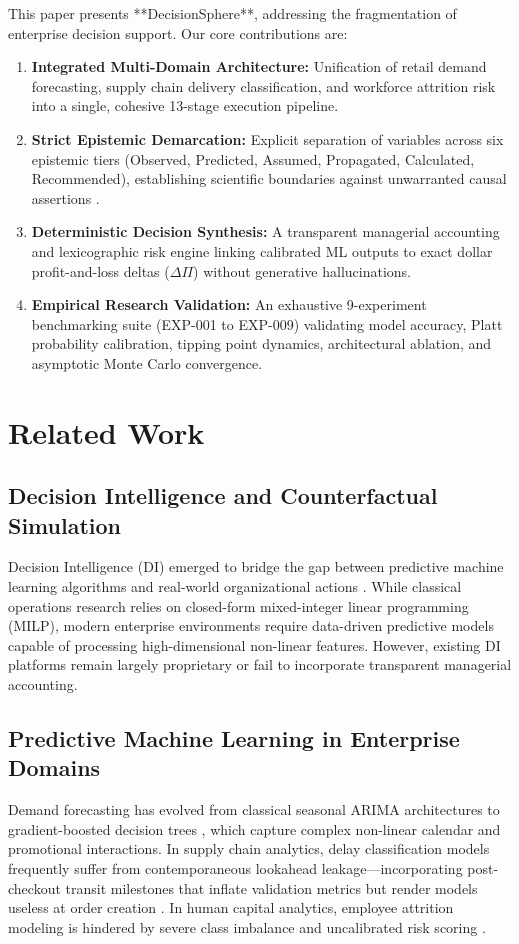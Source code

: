 \documentclass[conference]{IEEEtran}
\begin{document}
This paper presents **DecisionSphere**, addressing the fragmentation of enterprise decision support. Our core contributions are:
\begin{enumerate}
    \item \textbf{Integrated Multi-Domain Architecture:} Unification of retail demand forecasting, supply chain delivery classification, and workforce attrition risk into a single, cohesive 13-stage execution pipeline.
    \item \textbf{Strict Epistemic Demarcation:} Explicit separation of variables across six epistemic tiers (Observed, Predicted, Assumed, Propagated, Calculated, Recommended), establishing scientific boundaries against unwarranted causal assertions \cite{shmueli2010explain}.
    \item \textbf{Deterministic Decision Synthesis:} A transparent managerial accounting and lexicographic risk engine linking calibrated ML outputs to exact dollar profit-and-loss deltas ($\Delta \Pi$) without generative hallucinations.
    \item \textbf{Empirical Research Validation:} An exhaustive 9-experiment benchmarking suite (EXP-001 to EXP-009) validating model accuracy, Platt probability calibration, tipping point dynamics, architectural ablation, and asymptotic Monte Carlo convergence.
\end{enumerate}

\section{Related Work}

\subsection{Decision Intelligence and Counterfactual Simulation}
Decision Intelligence (DI) emerged to bridge the gap between predictive machine learning algorithms and real-world organizational actions \cite{pratt2019decision}. While classical operations research relies on closed-form mixed-integer linear programming (MILP), modern enterprise environments require data-driven predictive models capable of processing high-dimensional non-linear features. However, existing DI platforms remain largely proprietary or fail to incorporate transparent managerial accounting.

\subsection{Predictive Machine Learning in Enterprise Domains}
Demand forecasting has evolved from classical seasonal ARIMA architectures to gradient-boosted decision trees \cite{chen2016xgboost}, which capture complex non-linear calendar and promotional interactions. In supply chain analytics, delay classification models frequently suffer from contemporaneous lookahead leakage---incorporating post-checkout transit milestones that inflate validation metrics but render models useless at order creation \cite{constante2019dataco}. In human capital analytics, employee attrition modeling is hindered by severe class imbalance and uncalibrated risk scoring \cite{guo2017calibration}.
\end{document}
